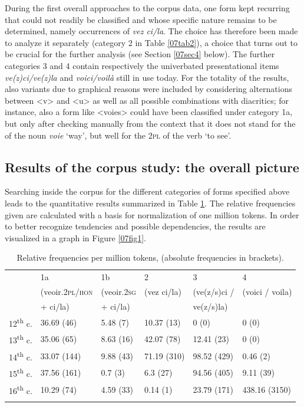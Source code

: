 \documentclass[output=paper,colorlinks,citecolor=brown]{langscibook}
\begin{document}
During the first overall approaches to the corpus data, one form kept recurring that could not readily be classified and whose specific nature remains to be determined, namely occurrences of \emph{vez ci/la}. The choice has therefore been made to analyze it separately (category 2 in Table \ref{07tab2}), a choice that turns out to be crucial for the further analysis (see Section \ref{07sec4} below). The further categories 3 and 4 contain respectively the univerbated presentational items \emph{ve(z)ci/ve(z)la} and \emph{voici/voilà} still in use today. For the totality of the results, also variants due to graphical reasons were included by considering alternations between \textless v\textgreater{} and \textless u\textgreater{} as well as all possible combinations with diacritics; for instance, also a form like \textless voies\textgreater{} could have been classified under category 1a, but only after checking manually from the context that it does not stand for the  of the noun \emph{voie} `way', but well for the \textsc{2pl} of the verb `to see'.

\subsection{Results of the corpus study: the overall picture}

Searching inside the corpus for the different categories of  forms specified above leads to the quantitative results summarized in Table \ref{07tab3}. The relative frequencies given are calculated with a basis for normalization of one million tokens. In order to better recognize tendencies and possible dependencies, the results are visualized in a graph in Figure \ref{07fig1}.

\begin{table}[ht]
	\centering
	\begin{tabularx}{\textwidth}{llllll}
		\lsptoprule
			& 1a & 1b & 2 & 3 & 4 \\
			& (veoir.\textsc{2pl/hon} & (veoir.\textsc{2sg} & (vez ci/la) & (ve(z/s)ci / & (voici / voila) \\
			& + ci/la) & + ci/la) & & ve(z/s)la) & \\
			\midrule
			12\textsuperscript{th} c. & 36.69 (46) & 5.48 (7) & 10.37 (13) & 0 (0) & 0 (0) \\
			13\textsuperscript{th} c. & 35.06 (65) & 8.63 (16) & 42.07 (78) & 12.41 (23) & 0 (0) \\
			14\textsuperscript{th} c. & 33.07 (144) & 9.88 (43) & 71.19 (310) & 98.52 (429) & 0.46 (2) \\
			15\textsuperscript{th} c. & 37.56 (161) & 0.7 (3) & 6.3 (27) & 94.56 (405) & 9.11 (39) \\
			16\textsuperscript{th} c. & 10.29 (74) & 4.59 (33) & 0.14 (1) & 23.79 (171) & 438.16 (3150) \\
		\lspbottomrule
	\end{tabularx}
	\caption{Relative frequencies per million tokens, (absolute frequencies in brackets).}
	\label{07tab3}
\end{table}
\end{document}
